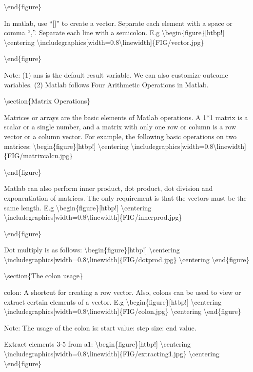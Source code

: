 \documentclass[10pt,math=newtx,citestyle=gb7714-2015,bibstyle=gb7714-2015]{elegantbook}
\begin{document}
	\textbackslash{}end\{figure\}
	
	In matlab, use ``[]'' to create a vector. Separate each element with a space or comma ``,''. Separate each line with a semicolon. E.g
	\textbackslash{}begin\{figure\}[htbp!]
	\textbackslash{}centering
	\textbackslash{}includegraphics[width=0.8\textbackslash{}linewidth]\{FIG/vector.jpg\}
	
	\textbackslash{}end\{figure\}
	
	Note: (1) ans is the default result variable. We can also customize outcome variables. (2) Matlab follows Four Arithmetic Operations in Matlab.
	
	\textbackslash{}section\{Matrix Operations\}
	
	Matrices or arrays are the basic elements of Matlab operations. A 1*1 matrix is a scalar or a single number, and a matrix with only one row or column is a row vector or a column vector. For example, the following basic operations on two matrices:
	\textbackslash{}begin\{figure\}[htbp!]
	\textbackslash{}centering
	\textbackslash{}includegraphics[width=0.8\textbackslash{}linewidth]\{FIG/matrixcalcu.jpg\}
	
	\textbackslash{}end\{figure\}
	
	Matlab can also perform inner product, dot product, dot division and exponentiation of matrices. The only requirement is that the vectors must be the same length. E.g
	\textbackslash{}begin\{figure\}[htbp!]
	\textbackslash{}centering
	\textbackslash{}includegraphics[width=0.8\textbackslash{}linewidth]\{FIG/innerprod.jpg\}
	
	\textbackslash{}end\{figure\}
	
	Dot multiply is as follows:
	\textbackslash{}begin\{figure\}[htbp!]
	\textbackslash{}centering
	\textbackslash{}includegraphics[width=0.8\textbackslash{}linewidth]\{FIG/dotprod.jpg\}
	\textbackslash{}centering
	\textbackslash{}end\{figure\}
	
	\textbackslash{}section\{The colon usage\}
	
	colon: A shortcut for creating a row vector. Also, colons can be used to view or extract certain elements of a vector. E.g
	\textbackslash{}begin\{figure\}[htbp!]
	\textbackslash{}centering
	\textbackslash{}includegraphics[width=0.8\textbackslash{}linewidth]\{FIG/colon.jpg\}
	\textbackslash{}centering
	\textbackslash{}end\{figure\}
	
	Note: The usage of the colon is: start value: step size: end value.
	
	Extract elements 3-5 from a1:
	\textbackslash{}begin\{figure\}[htbp!]
	\textbackslash{}centering
	\textbackslash{}includegraphics[width=0.8\textbackslash{}linewidth]\{FIG/extracting1.jpg\}
	\textbackslash{}centering
	\textbackslash{}end\{figure\}
	
\end{document}
